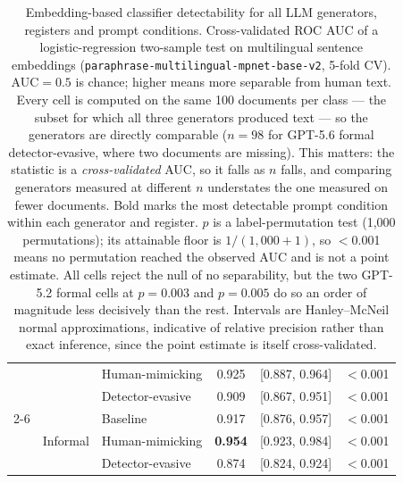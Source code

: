 \begin{table}[h!]
\begin{tabular}{lllccc}
      & & Human-mimicking  & 0.925 & [0.887, 0.964] & $<$0.001 \\
      & & Detector-evasive & 0.909 & [0.867, 0.951] & $<$0.001 \\
    \cmidrule(l){2-6}
      & \multirow{3}{*}{Informal}
        & Baseline         & 0.917 & [0.876, 0.957] & $<$0.001 \\
      & & Human-mimicking  & \textbf{0.954} & [0.923, 0.984] & $<$0.001 \\
      & & Detector-evasive & 0.874 & [0.824, 0.924] & $<$0.001 \\
    \bottomrule
  \end{tabular}
  \caption{Embedding-based classifier detectability for all LLM generators,
  registers and prompt conditions. Cross-validated ROC AUC of a
  logistic-regression two-sample test on multilingual sentence embeddings
  (\texttt{paraphrase-multilingual-mpnet-base-v2}, 5-fold CV). AUC${}=0.5$ is
  chance; higher means more separable from human text. Every cell is computed on
  the same 100 documents per class --- the subset for which all three generators
  produced text --- so the generators are directly comparable ($n=98$ for GPT-5.6 formal detector-evasive, where two documents are missing).
  This matters: the statistic is a \emph{cross-validated} AUC, so it falls as $n$
  falls, and comparing generators measured at different $n$ understates the one
  measured on fewer documents. Bold marks the most detectable prompt condition
  within each generator and register.
  $p$ is a label-permutation test (1,000 permutations); its attainable floor is
  $1/(1,000+1)$, so \mbox{$<$0.001} means no permutation reached the observed
  AUC and is not a point estimate. All cells reject the null of no separability,
  but the two GPT-5.2 formal cells at $p=0.003$ and $p=0.005$ do so an order of
  magnitude less decisively than the rest. Intervals are Hanley--McNeil
  normal approximations, indicative of relative precision rather than exact
  inference, since the point estimate is itself cross-validated.}
  \label{tab:embedding-auc}
\end{table}
